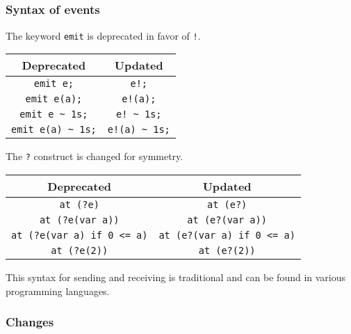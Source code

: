 \subsection{\us}

\subsubsection{Syntax of events}

The keyword \lstinline|emit| is deprecated in favor of \lstinline|!|.

\begin{center}
  \begin{tabular}{|c|c|}
    \hline
    Deprecated & Updated \\
    \hline
    \lstinline|emit e;| &              \lstinline|e!;| \\
    \lstinline|emit e(a);| &           \lstinline|e!(a);| \\
    \lstinline|emit e ~ 1s;| &         \lstinline|e! ~ 1s;| \\
    \lstinline|emit e(a) ~ 1s;| &      \lstinline|e!(a) ~ 1s;| \\
    \hline
  \end{tabular}
\end{center}

The \lstinline|?| construct is changed for symmetry.

\begin{center}
  \begin{tabular}{|c|c|}
    \hline
    Deprecated & Updated \\
    \hline
   \lstinline|at (?e)|                  & \lstinline|at (e?)|\\
   \lstinline|at (?e(var a))|           & \lstinline|at (e?(var a))|\\
   \lstinline|at (?e(var a) if 0 <= a)| & \lstinline|at (e?(var a) if 0 <= a)|\\
   \lstinline|at (?e(2))|               & \lstinline|at (e?(2))|\\
 \end{tabular}
\end{center}

This syntax for sending and receiving is traditional and can be found
in various programming languages.

\subsubsection{Changes}

